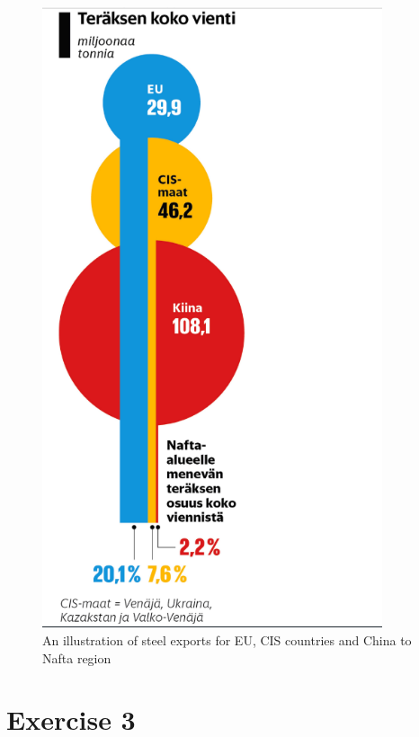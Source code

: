 \documentclass[a4paper,10pt]{article}
\begin{document}
\begin{figure}[h!]
\centering
\includegraphics[width = 10cm]{hesari}
\caption{An illustration of steel exports for EU, CIS countries and China to Nafta region}
\label{Hesari}
\end{figure}

\section*{Exercise 3}
\end{document}
